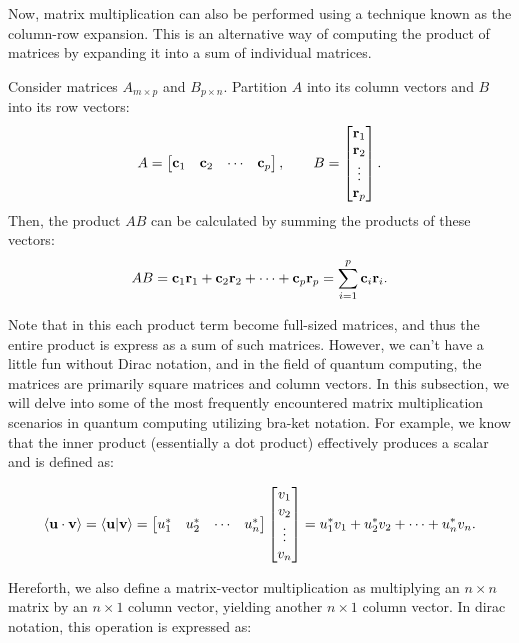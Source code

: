 \documentclass[12pt]{article}
\begin{document}
Now, matrix multiplication can also be performed using a technique known as the column-row expansion. This is an alternative way of computing the product of matrices by expanding it into a sum of individual matrices. 

\begin{theorem}
    Consider matrices $A_{m \times p}$ and $B_{p \times n}$. Partition $A$ into its column vectors and $B$ into its row vectors:
    \[
        A =
        \begin{bmatrix}
        \mathbf{c}_{1} & \mathbf{c}_{2} & \cdots & \mathbf{c}_{p}
        \end{bmatrix},
        \qquad
        B =
        \begin{bmatrix}
        \mathbf{r}_{1} \\
        \mathbf{r}_{2} \\
        \vdots   \\
        \mathbf{r}_{p}
        \end{bmatrix}.
    \]
    Then, the product $AB$ can be calculated by summing the products of these vectors:
    \[
        AB = \mathbf{c}_{1} \mathbf{r}_{1} + \mathbf{c}_{2} \mathbf{r}_{2} + \cdots + \mathbf{c}_{p} \mathbf{r}_{p}
           = \sum_{i=1}^{p} \mathbf{c}_{i} \mathbf{r}_{i}.
    \]
\end{theorem}

Note that in this each product term become full-sized matrices, and thus the entire product is express as a sum of such matrices. However, we can't have a little fun without Dirac notation, and in the field of quantum computing, the matrices are primarily square matrices and column vectors. In this subsection, we will delve into some of the most frequently encountered matrix multiplication scenarios in quantum computing utilizing bra-ket notation. For example, we know that the inner product (essentially a dot product) effectively produces a scalar and is defined as:

\[
\left\langle\mathbf{u} \cdot \mathbf{v} \right\rangle
= \braket{\mathbf{u}}{\mathbf{v}}
= \begin{bmatrix} u_{1}^{*} & u_{2}^{*} & \cdots & u_{n}^{*} \end{bmatrix}
  \begin{bmatrix}
  v_{1} \\
  v_{2} \\
  \vdots \\
  v_{n}
  \end{bmatrix}
= u_{1}^{*} v_{1} + u_{2}^{*} v_{2} + \cdots + u_{n}^{*} v_{n}.
\]

Hereforth, we also define a matrix-vector multiplication as multiplying an $n \times n$ matrix by an $n \times 1$ column vector, yielding another $n \times 1$ column vector. In dirac notation, this operation is expressed as:
\end{document}
